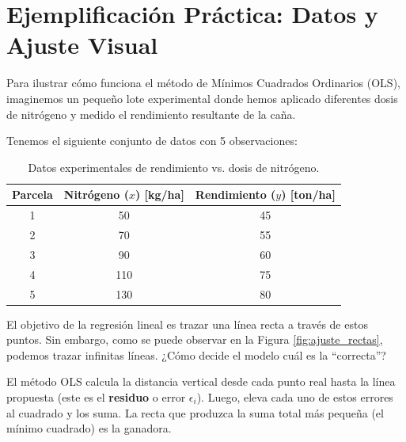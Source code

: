 \documentclass{article}
\begin{document}
\section{Ejemplificación Práctica: Datos y Ajuste Visual}

Para ilustrar cómo funciona el método de Mínimos Cuadrados Ordinarios (OLS), imaginemos un pequeño lote experimental donde hemos aplicado diferentes dosis de nitrógeno y medido el rendimiento resultante de la caña.

Tenemos el siguiente conjunto de datos con 5 observaciones:

\begin{table}[h]
\centering
\begin{tabular}{|c|c|c|}
\hline
\textbf{Parcela} & \textbf{Nitrógeno ($x$) [kg/ha]} & \textbf{Rendimiento ($y$) [ton/ha]} \\
\hline
1 & 50 & 45 \\
2 & 70 & 55 \\
3 & 90 & 60 \\
4 & 110 & 75 \\
5 & 130 & 80 \\
\hline
\end{tabular}
\caption{Datos experimentales de rendimiento vs. dosis de nitrógeno.}
\label{tab:datos_ejemplo}
\end{table}

El objetivo de la regresión lineal es trazar una línea recta a través de estos puntos. Sin embargo, como se puede observar en la Figura \ref{fig:ajuste_rectas}, podemos trazar infinitas líneas. ¿Cómo decide el modelo cuál es la ``correcta''?

El método OLS calcula la distancia vertical desde cada punto real hasta la línea propuesta (este es el \textbf{residuo} o error $\epsilon_i$). Luego, eleva cada uno de estos errores al cuadrado y los suma. La recta que produzca la suma total más pequeña (el mínimo cuadrado) es la ganadora.
\end{document}
